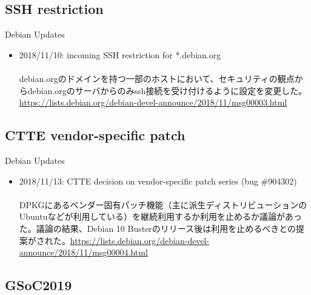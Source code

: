 \subsection{SSH restriction}

\begin{frame}{Debian Updates}%

\begin{itemize}
\item 2018/11/10: incoming SSH restriction for *.debian.org \\
\ \\
  \small{debian.orgのドメインを持つ一部のホストにおいて、セキュリティの観点からdebian.orgのサーバからのみssh接続を受け付けるように設定を変更した。\url{https://lists.debian.org/debian-devel-announce/2018/11/msg00003.html}}

\end{itemize}

\end{frame}


\subsection{CTTE vendor-specific patch}

\begin{frame}{Debian Updates}%

\begin{itemize}
\item 2018/11/13: CTTE decision on vendor-specific patch series (bug \#904302) \\
\ \\
  \small{DPKGにあるベンダー固有パッチ機能（主に派生ディストリビューションのUbuntuなどが利用している）を継続利用するか利用を止めるか議論があった。議論の結果、Debian 10 Busterのリリース後は利用を止めるべきとの提案がされた。\url{https://lists.debian.org/debian-devel-announce/2018/11/msg00004.html}}

\end{itemize}

\end{frame}


\subsection{GSoC2019}

